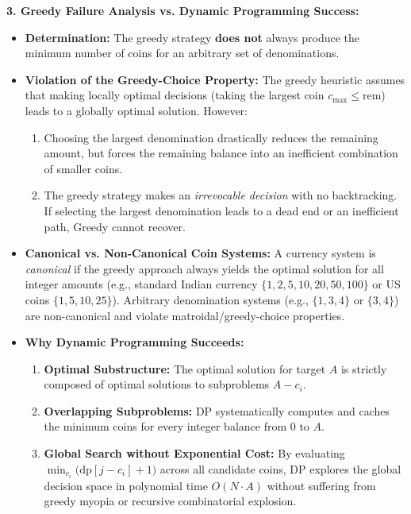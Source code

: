 \documentclass[12pt]{article}
\begin{document}
\textbf{3. Greedy Failure Analysis vs. Dynamic Programming Success:}

\begin{itemize}
    \item \textbf{Determination:} The greedy strategy \textbf{does not} always produce the minimum number of coins for an arbitrary set of denominations.
    \item \textbf{Violation of the Greedy-Choice Property:} The greedy heuristic assumes that making locally optimal decisions (taking the largest coin $c_{\max} \le \text{rem}$) leads to a globally optimal solution. However:
    \begin{enumerate}
        \item Choosing the largest denomination drastically reduces the remaining amount, but forces the remaining balance into an inefficient combination of smaller coins.
        \item The greedy strategy makes an \textit{irrevocable decision} with no backtracking. If selecting the largest denomination leads to a dead end or an inefficient path, Greedy cannot recover.
    \end{enumerate}
    \item \textbf{Canonical vs. Non-Canonical Coin Systems:} A currency system is \textit{canonical} if the greedy approach always yields the optimal solution for all integer amounts (e.g., standard Indian currency $\{1, 2, 5, 10, 20, 50, 100\}$ or US coins $\{1, 5, 10, 25\}$). Arbitrary denomination systems (e.g., $\{1, 3, 4\}$ or $\{3, 4\}$) are non-canonical and violate matroidal/greedy-choice properties.
    \item \textbf{Why Dynamic Programming Succeeds:}
    \begin{enumerate}
        \item \textbf{Optimal Substructure:} The optimal solution for target $A$ is strictly composed of optimal solutions to subproblems $A - c_i$.
        \item \textbf{Overlapping Subproblems:} DP systematically computes and caches the minimum coins for every integer balance from $0$ to $A$.
        \item \textbf{Global Search without Exponential Cost:} By evaluating $\min_{c_i} \big(\text{dp}[j - c_i] + 1\big)$ across all candidate coins, DP explores the global decision space in polynomial time $O(N \cdot A)$ without suffering from greedy myopia or recursive combinatorial explosion.
    \end{enumerate}
\end{itemize}
\end{document}
